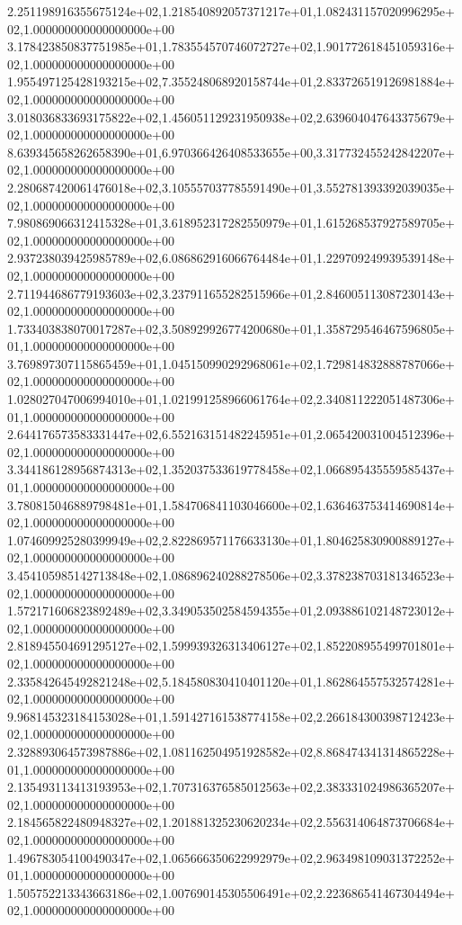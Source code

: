 2.251198916355675124e+02,1.218540892057371217e+01,1.082431157020996295e+02,1.000000000000000000e+00
3.178423850837751985e+01,1.783554570746072727e+02,1.901772618451059316e+02,1.000000000000000000e+00
1.955497125428193215e+02,7.355248068920158744e+01,2.833726519126981884e+02,1.000000000000000000e+00
3.018036833693175822e+02,1.456051129231950938e+02,2.639604047643375679e+02,1.000000000000000000e+00
8.639345658262658390e+01,6.970366426408533655e+00,3.317732455242842207e+02,1.000000000000000000e+00
2.280687420061476018e+02,3.105557037785591490e+01,3.552781393392039035e+02,1.000000000000000000e+00
7.980869066312415328e+01,3.618952317282550979e+01,1.615268537927589705e+02,1.000000000000000000e+00
2.937238039425985789e+02,6.086862916066764484e+01,1.229709249939539148e+02,1.000000000000000000e+00
2.711944686779193603e+02,3.237911655282515966e+01,2.846005113087230143e+02,1.000000000000000000e+00
1.733403838070017287e+02,3.508929926774200680e+01,1.358729546467596805e+01,1.000000000000000000e+00
3.769897307115865459e+01,1.045150990292968061e+02,1.729814832888787066e+02,1.000000000000000000e+00
1.028027047006994010e+01,1.021991258966061764e+02,2.340811222051487306e+01,1.000000000000000000e+00
2.644176573583331447e+02,6.552163151482245951e+01,2.065420031004512396e+02,1.000000000000000000e+00
3.344186128956874313e+02,1.352037533619778458e+02,1.066895435559585437e+01,1.000000000000000000e+00
3.780815046889798481e+01,1.584706841103046600e+02,1.636463753414690814e+02,1.000000000000000000e+00
1.074609925280399949e+02,2.822869571176633130e+01,1.804625830900889127e+02,1.000000000000000000e+00
3.454105985142713848e+02,1.086896240288278506e+02,3.378238703181346523e+02,1.000000000000000000e+00
1.572171606823892489e+02,3.349053502584594355e+01,2.093886102148723012e+02,1.000000000000000000e+00
2.818945504691295127e+02,1.599939326313406127e+02,1.852208955499701801e+02,1.000000000000000000e+00
2.335842645492821248e+02,5.184580830410401120e+01,1.862864557532574281e+02,1.000000000000000000e+00
9.968145323184153028e+01,1.591427161538774158e+02,2.266184300398712423e+02,1.000000000000000000e+00
2.328893064573987886e+02,1.081162504951928582e+02,8.868474341314865228e+01,1.000000000000000000e+00
2.135493113413193953e+02,1.707316376585012563e+02,2.383331024986365207e+02,1.000000000000000000e+00
2.184565822480948327e+02,1.201881325230620234e+02,2.556314064873706684e+02,1.000000000000000000e+00
1.496783054100490347e+02,1.065666350622992979e+02,2.963498109031372252e+01,1.000000000000000000e+00
1.505752213343663186e+02,1.007690145305506491e+02,2.223686541467304494e+02,1.000000000000000000e+00
